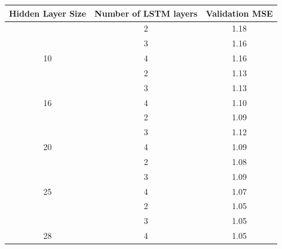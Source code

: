 \documentclass{article}
\begin{document}
\begin{table}[H]
\centering
\begin{tabular}{@{}ccc@{}}
\toprule
\multicolumn{1}{l}{Hidden Layer Size} & \multicolumn{1}{l}{Number of  LSTM layers} & \multicolumn{1}{l}{Validation MSE} \\ \midrule
                                      & 2                                          & 1.18                               \\
                                      & 3                                          & 1.16                               \\
\multirow{-3}{*}{10}                  & 4                                          & 1.16                               \\ \midrule
                                      & 2                                          & 1.13                               \\
                                      & 3                                          & 1.13                               \\
\multirow{-3}{*}{16}                  & 4                                          & 1.10                               \\ \midrule
                                      & 2                                          & 1.09                               \\
                                      & 3                                          & 1.12                               \\
\multirow{-3}{*}{20}                  & 4                                          & 1.09                               \\ \midrule
                                      & 2                                          & 1.08                               \\
                                      & 3                                          & 1.09                               \\
\multirow{-3}{*}{25}                  & 4                                          & 1.07                               \\ \midrule
                                      & 2                                          & \cellcolor[HTML]{32CB00}1.05       \\
                                      & 3                                          & 1.05                               \\
\multirow{-3}{*}{28}                  & 4                                          & 1.05                               \\ \bottomrule
\end{tabular}
\end{table}
\end{document}
